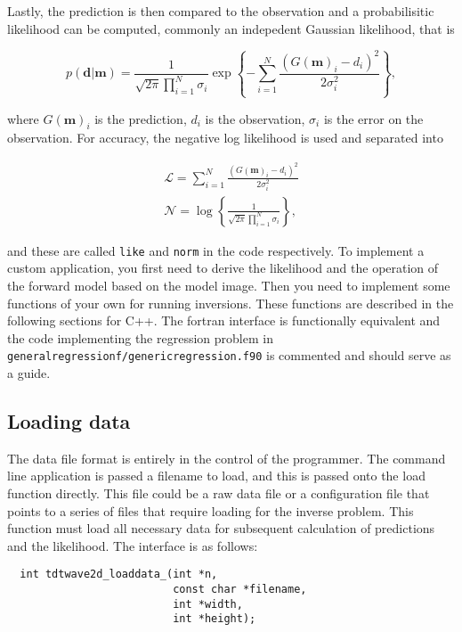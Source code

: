 \documentclass[a4paper,12pt]{article}
\begin{document}
Lastly, the prediction is then compared to the observation and a
probabilisitic likelihood can be computed, commonly an indepedent
Gaussian likelihood, that is

\begin{equation}
  p(\mathbf{d}|\mathbf{m}) = \frac{1}{\sqrt{2 \pi} \prod_{i=1}^N \sigma_i} \exp \left\{
  - \sum_{i = 1}^N \frac{(G(\mathbf{m})_i - d_i)^2}{2\sigma_i^2} \right\}
    ,
\end{equation}

where $G(\mathbf{m})_i$ is the prediction, $d_i$ is the observation,
$\sigma_i$ is the error on the observation. For accuracy, the negative
log likelihood is used and separated into

\begin{align}
  \label{eqn:like}
  \mathcal{L} = \sum_{i = 1}^N \frac{(G(\mathbf{m})_i - d_i)^2}{2\sigma_i^2} \\
  \label{eqn:norm}
  \mathcal{N} = \log \left\{ \frac{1}{\sqrt{2 \pi} \prod_{i=1}^N \sigma_i} \right\}
  ,
\end{align}

and these are called {\tt like} and {\tt norm} in the code
respectively. To implement a custom application, you first need to
derive the likelihood and the operation of the forward model based
on the model image. Then you need to implement some functions of
your own for running inversions. These functions are described in
the following sections for C++. The fortran interface is functionally
equivalent and the code implementing the regression problem in
{\tt generalregressionf/genericregression.f90} is commented and
should serve as a guide.

\subsection{Loading data}

The data file format is entirely in the control of the programmer.
The command line application is passed a filename to load, and this is
passed onto the load function directly. This file could be a raw data
file or a configuration file that points to a series of files that
require loading for the inverse problem. This function must load all
necessary data for subsequent calculation of predictions and the
likelihood. The interface is as follows:

\begin{verbatim}
  int tdtwave2d_loaddata_(int *n,
                          const char *filename,
                          int *width,
                          int *height);
\end{verbatim}
\end{document}

